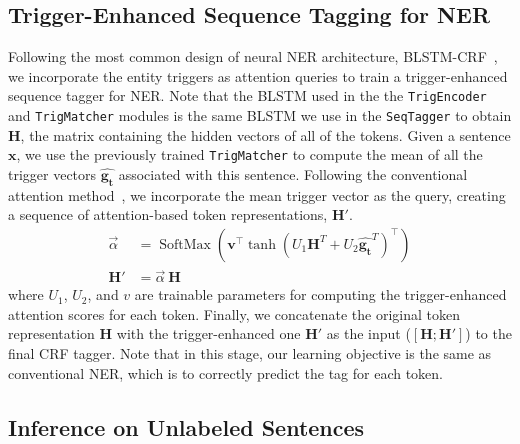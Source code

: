 \subsection{Trigger-Enhanced Sequence Tagging for NER}
\label{sec:secondstage}
Following the most common design of neural NER architecture, BLSTM-CRF~\cite{DBLP:conf/acl/MaH16}, we incorporate the entity triggers as attention queries 
to train a trigger-enhanced sequence tagger for NER. Note that the BLSTM used in the the \texttt{TrigEncoder} and \texttt{TrigMatcher} modules is the same BLSTM we use in the \texttt{SeqTagger} to obtain $\mathbf{H}$, the matrix containing the hidden vectors of all of the tokens.
Given a sentence $\mathbf{x}$, we use the previously trained \texttt{TrigMatcher} to compute the mean of all the trigger vectors $\hat{\mathbf{g_t}}$ associated with this sentence.
Following the conventional attention method~\cite{luong2015effective}, 
we incorporate the mean trigger vector as the query, creating a sequence of attention-based token representations, $\mathbf{H}'$.
{
    {
        \begin{align*} 
            \vec{\alpha}  &= \operatorname{SoftMax}\left(\boldsymbol{v}^{\top} \tanh \left({U}_{1}\mathbf{H}^T + {U}_{2}\hat{\mathbf{g_t}}^T \right)^{\top}\right)\\
            \mathbf{H'} &=  \vec{\alpha}~\mathbf{H}
        \end{align*} 
    }
}
\noindent
where $U_1$, $U_2$, and $v$ are trainable parameters for computing the trigger-enhanced attention scores for each token.
Finally, we concatenate the original token representation $\mathbf{H}$ with the trigger-enhanced one $\mathbf{H}'$ as the input ($[\mathbf{H};\mathbf{H}']$) to the final CRF tagger.
Note that in this stage, our learning objective is the same as conventional NER, which is to correctly predict the tag for each token.




\subsection{Inference on Unlabeled Sentences}
\label{sec:inference}

